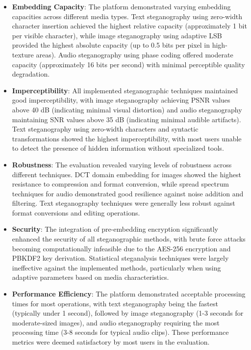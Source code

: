 \documentclass[12pt, a4paper, oneside]{book}
\begin{document}
\begin{itemize}[leftmargin=*]
    \item \textbf{Embedding Capacity}: The platform demonstrated varying embedding capacities across different media types. Text steganography using zero-width character insertion achieved the highest relative capacity (approximately 1 bit per visible character), while image steganography using adaptive LSB provided the highest absolute capacity (up to 0.5 bits per pixel in high-texture areas). Audio steganography using phase coding offered moderate capacity (approximately 16 bits per second) with minimal perceptible quality degradation.

    \item \textbf{Imperceptibility}: All implemented steganographic techniques maintained good imperceptibility, with image steganography achieving PSNR values above 40 dB (indicating minimal visual distortion) and audio steganography maintaining SNR values above 35 dB (indicating minimal audible artifacts). Text steganography using zero-width characters and syntactic transformations showed the highest imperceptibility, with most users unable to detect the presence of hidden information without specialized tools.

    \item \textbf{Robustness}: The evaluation revealed varying levels of robustness across different techniques. DCT domain embedding for images showed the highest resistance to compression and format conversion, while spread spectrum techniques for audio demonstrated good resilience against noise addition and filtering. Text steganography techniques were generally less robust against format conversions and editing operations.

    \item \textbf{Security}: The integration of pre-embedding encryption significantly enhanced the security of all steganographic methods, with brute force attacks becoming computationally infeasible due to the AES-256 encryption and PBKDF2 key derivation. Statistical steganalysis techniques were largely ineffective against the implemented methods, particularly when using adaptive parameters based on media characteristics.

    \item \textbf{Performance Efficiency}: The platform demonstrated acceptable processing times for most operations, with text steganography being the fastest (typically under 1 second), followed by image steganography (1-3 seconds for moderate-sized images), and audio steganography requiring the most processing time (3-8 seconds for typical audio clips). These performance metrics were deemed satisfactory by most users in the evaluation.
\end{itemize}
\end{document}
